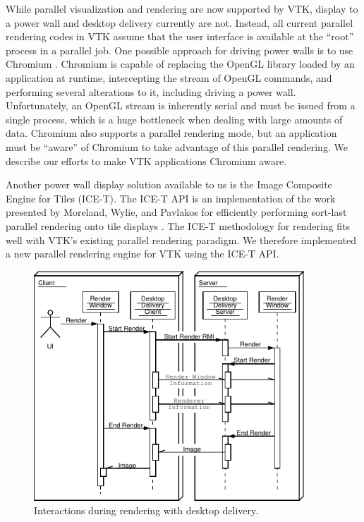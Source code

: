 \documentclass[letterpaper]{acmsiggraph}
\begin{document}
  While parallel visualization and rendering are now supported by VTK,
  display to a power wall and desktop delivery currently are not.  Instead,
  all current parallel rendering codes in VTK assume that the user
  interface is available at the ``root'' process in a parallel job.  One
  possible approach for driving power walls is to use Chromium
  \cite{Humphreys02}.  Chromium is capable of replacing the OpenGL library
  loaded by an application at runtime, intercepting the stream of OpenGL
  commands, and performing several alterations to it, including driving a
  power wall.  Unfortunately, an OpenGL stream is inherently serial and
  must be issued from a single process, which is a huge bottleneck when
  dealing with large amounts of data.  Chromium also supports a parallel
  rendering mode, but an application must be ``aware'' of Chromium to take
  advantage of this parallel rendering.  We describe our efforts to make
  VTK applications Chromium aware.

  Another power wall display solution available to us is the Image
  Composite Engine for Tiles (ICE-T).  The ICE-T API is an implementation
  of the work presented by Moreland, Wylie, and Pavlakos for efficiently
  performing sort-last parallel rendering onto tile displays
  \cite{Moreland01}.  The ICE-T methodology for rendering fits well with
  VTK's existing parallel rendering paradigm.  We therefore implemented a
  new parallel rendering engine for VTK using the ICE-T API.


  \begin{figure}[ht]
    \begin{center}
      \includegraphics[width=4in]{images/DesktopDeliveryInteraction}
      \caption{Interactions during rendering with desktop delivery.}
      \label{fig:desktop_delivery_interaction}
    \end{center}
  \end{figure}
\end{document}
